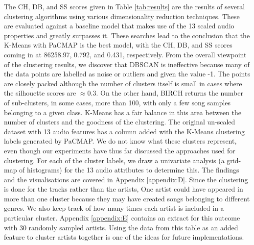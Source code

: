 The CH, DB, and SS scores given in Table \ref{tab:results} are the results of several clustering algorithms using various dimensionality reduction techniques. These are evaluated against a baseline model that makes use of the 13 scaled audio properties and greatly surpasses it. These searches lead to the conclusion that the K-Means with PaCMAP is the best model, with the CH, DB, and SS scores coming in at 86258.97, 0.792, and 0.431, respectively. From the overall viewpoint of the clustering results, we discover that DBSCAN is ineffective because many of the data points are labelled as noise or outliers and given the value -1. The points are closely packed although the number of clusters itself is small in cases where the silhouette scores are $\approx0.3$. On the other hand, BIRCH returns the number of sub-clusters, in some cases, more than 100, with only a few song samples belonging to a given class. K-Means has a fair balance in this area between the number of clusters and the goodness of the clustering. The original un-scaled dataset with 13 audio features has a column added with the K-Means clustering labels generated by PaCMAP. We do not know what these clusters represent, even though our experiments have thus far discussed the approaches used for clustering. For each of the cluster labels, we draw a univariate analysis (a grid-map of histograms) for the 13 audio attributes to determine this. The findings and the visualisations are covered in Appendix \ref{appendix:D}. Since the clustering is done for the tracks rather than the artists, One artist could have appeared in more than one cluster because they may have created songs belonging to different genres. We also keep track of how many times each artist is included in a particular cluster. Appendix \ref{appendix:E} contains an extract for this outcome with 30 randomly sampled artists. Using the data from this table as an added feature to cluster artists together is one of the ideas for future implementations.

